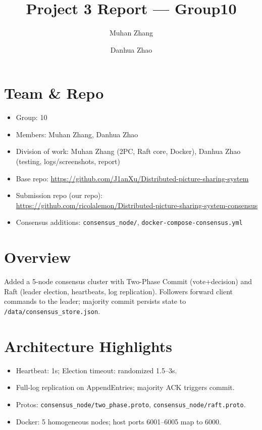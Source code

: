 \documentclass[11pt]{article}
\title{Project 3 Report --- Group10}
\author{Muhan Zhang \and Danhua Zhao}
\date{}
\begin{document}
\maketitle

\section*{Team \& Repo}
\begin{itemize}[leftmargin=*]
  \item Group: 10
  \item Members: Muhan Zhang, Danhua Zhao
  \item Division of work: Muhan Zhang (2PC, Raft core, Docker), Danhua Zhao (testing, logs/screenshots, report)
  \item Base repo: \url{https://github.com/J1anXu/Distributed-picture-sharing-system}
  \item Submission repo (our repo):\\ \url{https://github.com/ricolalemon/Distributed-picture-sharing-system-consensus}
  \item Consensus additions: \texttt{consensus\_node/}, \texttt{docker-compose-consensus.yml}
\end{itemize}

\section*{Overview}
Added a 5-node consensus cluster with Two-Phase Commit (vote+decision) and Raft (leader election, heartbeats, log replication). Followers forward client commands to the leader; majority commit persists state to \texttt{/data/consensus\_store.json}.

\section*{Architecture Highlights}
\begin{itemize}[leftmargin=*]
  \item Heartbeat: 1s; Election timeout: randomized 1.5--3s.
  \item Full-log replication on AppendEntries; majority ACK triggers commit.
  \item Protos: \texttt{consensus\_node/two\_phase.proto}, \texttt{consensus\_node/raft.proto}.
  \item Docker: 5 homogeneous nodes; host ports 6001--6005 map to 6000.
\end{itemize}
\end{document}
